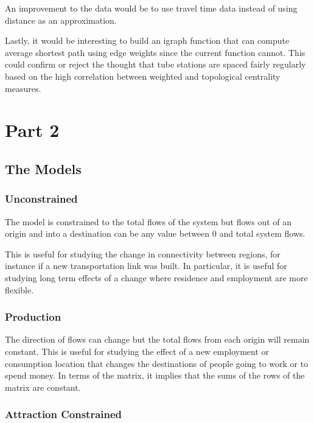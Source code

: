 \documentclass[11pt]{article} %
\begin{document}
An improvement to the data would be to use travel time data instead of using distance as an approximation. 

Lastly, it would be interesting to build an igraph function that can compute average shortest path using edge weights since the current function cannot. This could confirm or reject the thought that tube stations are spaced fairly regularly based on the high correlation between weighted and topological centrality measures. 


\pagebreak

\section{Part 2}

\subsection{The Models}

\subsubsection{Unconstrained}

The model is constrained to the total flows of the system but flows out of an origin and into a destination can be any value between 0 and total system flows. 

This is useful for studying the change in connectivity between regions, for instance if a new transportation link was built. In particular, it is useful for studying long term effects of a change where residence and employment are more flexible. 

\subsubsection{Production}

The direction of flows can change but the total flows from each origin will remain constant. This is useful for studying the effect of a new employment or consumption location that changes the destinations of people going to work or to spend money. In terms of the matrix, it implies that the sums of the rows of the matrix are constant. 

\subsubsection{Attraction Constrained}
\end{document}
